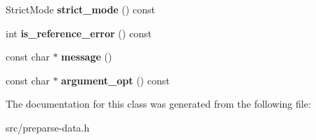 \begin{DoxyCompactItemize}
\item 
\hypertarget{classv8_1_1internal_1_1_singleton_logger_ac1e990fb6349137711de5418fa3163fe}{}Strict\+Mode {\bfseries strict\+\_\+mode} () const \label{classv8_1_1internal_1_1_singleton_logger_ac1e990fb6349137711de5418fa3163fe}

\item 
\hypertarget{classv8_1_1internal_1_1_singleton_logger_abea1f9ffb6672b433c59aeab7bea181f}{}int {\bfseries is\+\_\+reference\+\_\+error} () const \label{classv8_1_1internal_1_1_singleton_logger_abea1f9ffb6672b433c59aeab7bea181f}

\item 
\hypertarget{classv8_1_1internal_1_1_singleton_logger_a6b3c55d4898f0a5e1330aef9b1a5fb28}{}const char $\ast$ {\bfseries message} ()\label{classv8_1_1internal_1_1_singleton_logger_a6b3c55d4898f0a5e1330aef9b1a5fb28}

\item 
\hypertarget{classv8_1_1internal_1_1_singleton_logger_aa7e9ab45ccafeeff8f62d89b27ca3c8b}{}const char $\ast$ {\bfseries argument\+\_\+opt} () const \label{classv8_1_1internal_1_1_singleton_logger_aa7e9ab45ccafeeff8f62d89b27ca3c8b}

\end{DoxyCompactItemize}


The documentation for this class was generated from the following file\+:\begin{DoxyCompactItemize}
\item 
src/preparse-\/data.\+h\end{DoxyCompactItemize}
